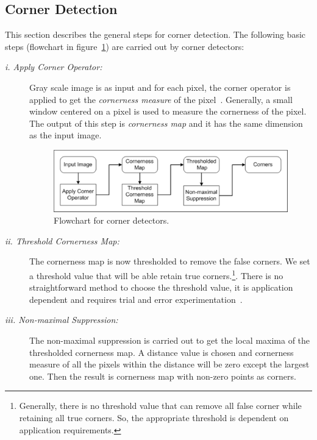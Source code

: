 \subsection{Corner Detection}
This section  describes the general steps for corner detection. The following basic steps (flowchart in figure~\ref{fig:flowchart_corner-detection}) are carried out by corner detectors:
\begin{description}
\item [\textit{i. Apply Corner Operator:}] Gray scale image is as input and for each pixel, the corner operator is applied to get the \textit{cornerness measure} of the pixel~\cite{Parks:11}. Generally, a small window centered on a pixel is used to measure the cornerness of the pixel. The output of this step is \textit{cornerness map} and it has the same dimension as the input image.

\begin{figure}[H]%
\centering
\includegraphics[width=1\columnwidth]{2.mainmatter/1.Introduction/figures/CornerFlowChart}%
\caption[Flowchart for Corner Detectors]{Flowchart for corner detectors.}%
\label{fig:flowchart_corner-detection}%
\end{figure}


\item [\textit{ii. Threshold Cornerness Map:}] The cornerness map is now thresholded to remove the false corners. We set a threshold value that will be able retain true corners.\footnote{Generally, there is no threshold value that can remove all false corner while retaining all true corners. So, the appropriate threshold is dependent on application requirements.}. There is no straightforward method to choose the threshold value, it is application dependent and requires trial and error experimentation~\cite{Parks:11}.
\item [\textit{iii. Non-maximal Suppression:}] The non-maximal suppression is carried out to get the local maxima of the thresholded cornerness map. A distance value is chosen and cornerness measure of all the pixels within the distance will be zero except the largest one. Then the result is cornerness map with non-zero points as corners. 
\end{description}

